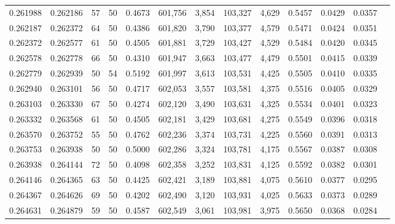 \begin{tabular}{rrrrrrrrrrrrr}
0.261988 & 0.262186 &    57 &  50 &                                     0.4673 & 601,756 &   3,854 & 103,327 &   4,629 & 0.5457 & 0.0429 & 0.0357 \\
0.262187 & 0.262372 &    64 &  50 &                                     0.4386 & 601,820 &   3,790 & 103,377 &   4,579 & 0.5471 & 0.0424 & 0.0351 \\
0.262372 & 0.262577 &    61 &  50 &                                     0.4505 & 601,881 &   3,729 & 103,427 &   4,529 & 0.5484 & 0.0420 & 0.0345 \\
0.262578 & 0.262778 &    66 &  50 &                                     0.4310 & 601,947 &   3,663 & 103,477 &   4,479 & 0.5501 & 0.0415 & 0.0339 \\
0.262779 & 0.262939 &    50 &  54 &                                     0.5192 & 601,997 &   3,613 & 103,531 &   4,425 & 0.5505 & 0.0410 & 0.0335 \\
0.262940 & 0.263101 &    56 &  50 &                                     0.4717 & 602,053 &   3,557 & 103,581 &   4,375 & 0.5516 & 0.0405 & 0.0329 \\
0.263103 & 0.263330 &    67 &  50 &                                     0.4274 & 602,120 &   3,490 & 103,631 &   4,325 & 0.5534 & 0.0401 & 0.0323 \\
0.263332 & 0.263568 &    61 &  50 &                                     0.4505 & 602,181 &   3,429 & 103,681 &   4,275 & 0.5549 & 0.0396 & 0.0318 \\
0.263570 & 0.263752 &    55 &  50 &                                     0.4762 & 602,236 &   3,374 & 103,731 &   4,225 & 0.5560 & 0.0391 & 0.0313 \\
0.263753 & 0.263938 &    50 &  50 &                                     0.5000 & 602,286 &   3,324 & 103,781 &   4,175 & 0.5567 & 0.0387 & 0.0308 \\
0.263938 & 0.264144 &    72 &  50 &                                     0.4098 & 602,358 &   3,252 & 103,831 &   4,125 & 0.5592 & 0.0382 & 0.0301 \\
0.264146 & 0.264365 &    63 &  50 &                                     0.4425 & 602,421 &   3,189 & 103,881 &   4,075 & 0.5610 & 0.0377 & 0.0295 \\
0.264367 & 0.264626 &    69 &  50 &                                     0.4202 & 602,490 &   3,120 & 103,931 &   4,025 & 0.5633 & 0.0373 & 0.0289 \\
0.264631 & 0.264879 &    59 &  50 &                                     0.4587 & 602,549 &   3,061 & 103,981 &   3,975 & 0.5650 & 0.0368 & 0.0284 \\

\end{tabular}
